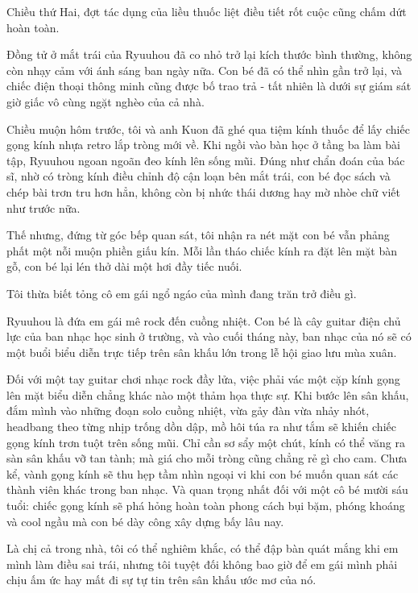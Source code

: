 \documentclass[../main.tex]{subfiles}
\begin{document}

Chiều thứ Hai, đợt tác dụng của liều thuốc liệt điều tiết rốt cuộc cũng chấm dứt hoàn toàn.

Đồng tử ở mắt trái của Ryuuhou đã co nhỏ trở lại kích thước bình thường, không còn nhạy cảm với ánh sáng ban ngày nữa. Con bé đã có thể nhìn gần trở lại, và chiếc điện thoại thông minh cũng được bố trao trả - tất nhiên là dưới sự giám sát giờ giấc vô cùng ngặt nghèo của cả nhà.

Chiều muộn hôm trước, tôi và anh Kuon đã ghé qua tiệm kính thuốc để lấy chiếc gọng kính nhựa retro lắp tròng mới về. Khi ngồi vào bàn học ở tầng ba làm bài tập, Ryuuhou ngoan ngoãn đeo kính lên sống mũi. Đúng như chẩn đoán của bác sĩ, nhờ có tròng kính điều chỉnh độ cận loạn bên mắt trái, con bé đọc sách và chép bài trơn tru hơn hẳn, không còn bị nhức thái dương hay mờ nhòe chữ viết như trước nữa.

Thế nhưng, đứng từ góc bếp quan sát, tôi nhận ra nét mặt con bé vẫn phảng phất một nỗi muộn phiền giấu kín. Mỗi lần tháo chiếc kính ra đặt lên mặt bàn gỗ, con bé lại lén thở dài một hơi đầy tiếc nuối.

Tôi thừa biết tỏng cô em gái ngổ ngáo của mình đang trăn trở điều gì.

Ryuuhou là đứa em gái mê rock đến cuồng nhiệt. Con bé là cây guitar điện chủ lực của ban nhạc học sinh ở trường, và vào cuối tháng này, ban nhạc của nó sẽ có một buổi biểu diễn trực tiếp trên sân khấu lớn trong lễ hội giao lưu mùa xuân.

Đối với một tay guitar chơi nhạc rock đầy lửa, việc phải vác một cặp kính gọng lên mặt biểu diễn chẳng khác nào một thảm họa thực sự. Khi bước lên sân khấu, đắm mình vào những đoạn solo cuồng nhiệt, vừa gảy đàn vừa nhảy nhót, headbang theo từng nhịp trống dồn dập, mồ hôi túa ra như tắm sẽ khiến chiếc gọng kính trơn tuột trên sống mũi. Chỉ cần sơ sẩy một chút, kính có thể văng ra sàn sân khấu vỡ tan tành; mà giá cho mỗi tròng cũng chẳng rẻ gì cho cam. Chưa kể, vành gọng kính sẽ thu hẹp tầm nhìn ngoại vi khi con bé muốn quan sát các thành viên khác trong ban nhạc. Và quan trọng nhất đối với một cô bé mười sáu tuổi: chiếc gọng kính sẽ phá hỏng hoàn toàn phong cách bụi bặm, phóng khoáng và cool ngầu mà con bé dày công xây dựng bấy lâu nay.

Là chị cả trong nhà, tôi có thể nghiêm khắc, có thể đập bàn quát mắng khi em mình làm điều sai trái, nhưng tôi tuyệt đối không bao giờ để em gái mình phải chịu ấm ức hay mất đi sự tự tin trên sân khấu ước mơ của nó.
\end{document}
